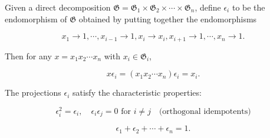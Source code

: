 Given a direct decomposition $\mathfrak{G} = \mathfrak{G}_1 \times \mathfrak{G}_2 \times \cdots \times \mathfrak{G}_n$, define $\epsilon_i$ to be the endomorphism of $\mathfrak{G}$ obtained by putting together the endomorphisms

$$x_1 \rightarrow 1, \cdots, x_{i-1} \rightarrow 1, x_i \rightarrow x_i, x_{i+1} \rightarrow 1, \cdots, x_n \rightarrow 1.$$

Then for any $x = x_1x_2 \cdots x_n$ with $x_i \in \mathfrak{G}_i$,

$$x\epsilon_i = (x_1x_2 \cdots x_n)\epsilon_i = x_i.$$

The projections $\epsilon_i$ satisfy the characteristic properties:

$$\epsilon_i^2 = \epsilon_i, \quad \epsilon_i\epsilon_j = 0 \text{ for } i \neq j \quad \text{(orthogonal idempotents)}$$

$$\epsilon_1 + \epsilon_2 + \cdots + \epsilon_n = 1.$$
